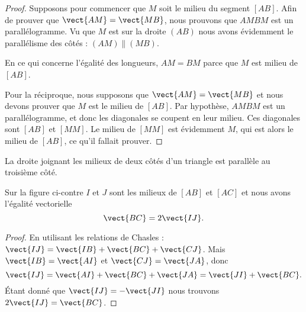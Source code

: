 \begin{proof}
    Supposons pour commencer que \( M\) soit le milieu du segment \( [AB]\). Afin de prouver que \( \vect{ AM }=\vect{ MB }\), nous prouvons que \( AMBM\) est un parallélogramme. Vu que \( M\) est sur la droite \( (AB)\) nous avons évidemment le parallélisme des côtés : \( (AM)\parallel (MB)\).

    En ce qui concerne l'égalité des longueurs, \( AM=BM\) parce que \( M\) est milieu de \( [AB]\).

    Pour la réciproque, nous supposons que \( \vect{ AM }=\vect{ MB }\) et nous devons prouver que \( M\) est le milieu de \( [AB]\).  Par hypothèse, \( AMBM\) est un parallélogramme, et donc les diagonales se coupent en leur milieu. Ces diagonales sont \( [AB]\) et \( [MM]\). Le milieu de \( [MM]\) est évidemment \( M\), qui est alors le milieu de \( [AB]\), ce qu'il fallait prouver.
\end{proof}

\begin{theorem}

    \begin{multicols}{2}
    La droite joignant les milieux de deux côtés d'un triangle est parallèle au troisième côté.

    Sur la figure ci-contre \( I\) et \( J\) sont les milieux de \( [AB]\) et \( [AC]\) et nous avons l'égalité vectorielle
    \begin{equation}
        \vect{ BC }=2\vect{ IJ }.
    \end{equation}

    \columnbreak

    \begin{center}

    \end{center}

    \end{multicols}
\end{theorem}

\begin{proof}
    En utilisant les relations de Chasles : \( \vect{ IJ }=\vect{ IB }+\vect{ BC }+\vect{ CJ }\). Mais \( \vect{ IB }=\vect{ AI }\) et \( \vect{ CJ }=\vect{ JA }\), donc
    \begin{equation}
        \vect{ IJ }=\vect{ AI }+\vect{ BC }+\vect{ JA }=\vect{ JI }+\vect{ BC }.
    \end{equation}
    Étant donné que \( \vect{ IJ }=-\vect{ JI }\) nous trouvons \( 2\vect{ IJ }=\vect{ BC }\).
\end{proof}

